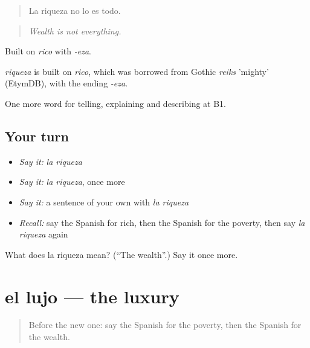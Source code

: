 \begin{quote}
La riqueza no lo es todo.
\end{quote}

\begin{quote}
\emph{Wealth is not everything.}
\end{quote}

Built on \emph{rico} with \emph{-eza}.

\begin{cousinweb}
\emph{riqueza} is built on \emph{rico}, which was borrowed from Gothic \emph{reiks} 'mighty' (EtymDB), with the ending \emph{-eza}.
\end{cousinweb}

\begin{grammarlens}[title={What you've built}]
One more word for telling, explaining and describing at B1.
\end{grammarlens}

\subsection*{Your turn}
\begin{itemize}
\raggedright
  \item \emph{Say it:} \emph{la riqueza}
  \item \emph{Say it:} \emph{la riqueza}, once more
  \item \emph{Say it:} a sentence of your own with \emph{la riqueza}
  \item \emph{Recall:} say the Spanish for rich, then the Spanish for the poverty, then say \emph{la riqueza} again
\end{itemize}

\begin{tcolorbox}[breakable,colback=teal!4,colframe=teal!35!black,title={Before you move on}]
What does la riqueza mean? (\textquotedblleft{}The wealth\textquotedblright{}.) Say it once more.
\end{tcolorbox}
\section[el lujo]{el lujo — the luxury}

\label{lesson:ES-C633-lujo}



\begin{quote}
Before the new one: say the Spanish for the poverty, then the Spanish for the wealth.
\end{quote}

